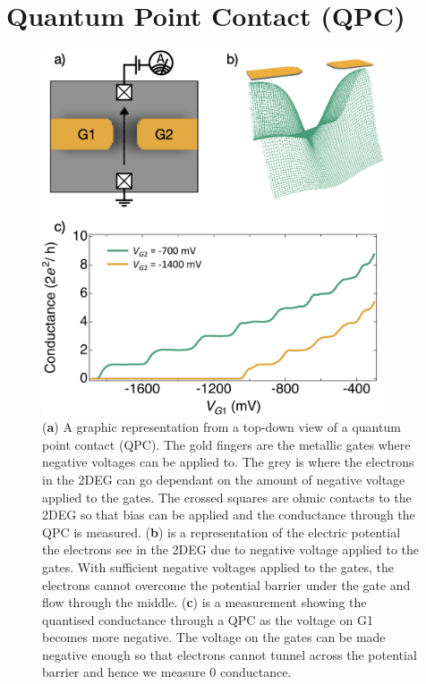 \afterpage{\clearpage}
\section{Quantum Point Contact (QPC)}

\begin{figure}[!htb]
  \begin{center}
    \includegraphics[width=0.9\textwidth]{figures/ch1/crop_PosterFiguresMaster.002.png}
    \caption[Conductance through a quantum point contact]{\label{fig:ch1/qpc_intro} 
    (\textbf{a}) A graphic representation from a top-down view of a quantum point contact (QPC). The gold fingers are the metallic gates where negative voltages can be applied to. The grey is where the electrons in the 2DEG can go dependant on the amount of negative voltage applied to the gates. The crossed squares are ohmic contacts to the 2DEG so that bias can be applied and the conductance through the QPC is measured. (\textbf{b}) is a representation of the electric potential the electrons see in the 2DEG due to negative voltage applied to the gates. With sufficient negative voltages applied to the gates, the electrons cannot overcome the potential barrier under the gate and flow through the middle. (\textbf{c}) is a measurement showing the quantised conductance through a QPC as the voltage on G1 becomes more negative. The voltage on the gates can be made negative enough so that electrons cannot tunnel across the potential barrier and hence we measure 0 conductance. 
      }
  \end{center}
\end{figure}

